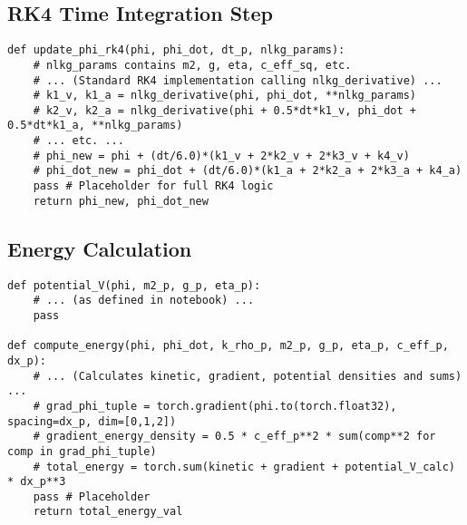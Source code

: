 \documentclass[11pt]{article}
\begin{document}
\subsection{RK4 Time Integration Step}
\begin{lstlisting}[caption=RK4 Update Function, label=lst:rk4]
def update_phi_rk4(phi, phi_dot, dt_p, nlkg_params):
    # nlkg_params contains m2, g, eta, c_eff_sq, etc.
    # ... (Standard RK4 implementation calling nlkg_derivative) ...
    # k1_v, k1_a = nlkg_derivative(phi, phi_dot, **nlkg_params)
    # k2_v, k2_a = nlkg_derivative(phi + 0.5*dt*k1_v, phi_dot + 0.5*dt*k1_a, **nlkg_params)
    # ... etc. ...
    # phi_new = phi + (dt/6.0)*(k1_v + 2*k2_v + 2*k3_v + k4_v)
    # phi_dot_new = phi_dot + (dt/6.0)*(k1_a + 2*k2_a + 2*k3_a + k4_a)
    pass # Placeholder for full RK4 logic
    return phi_new, phi_dot_new 
\end{lstlisting}

\subsection{Energy Calculation}
\begin{lstlisting}[caption=Energy Computation, label=lst:energy_calc]
def potential_V(phi, m2_p, g_p, eta_p):
    # ... (as defined in notebook) ...
    pass

def compute_energy(phi, phi_dot, k_rho_p, m2_p, g_p, eta_p, c_eff_p, dx_p):
    # ... (Calculates kinetic, gradient, potential densities and sums) ...
    # grad_phi_tuple = torch.gradient(phi.to(torch.float32), spacing=dx_p, dim=[0,1,2])
    # gradient_energy_density = 0.5 * c_eff_p**2 * sum(comp**2 for comp in grad_phi_tuple)
    # total_energy = torch.sum(kinetic + gradient + potential_V_calc) * dx_p**3
    pass # Placeholder
    return total_energy_val
\end{lstlisting}
\end{document}
